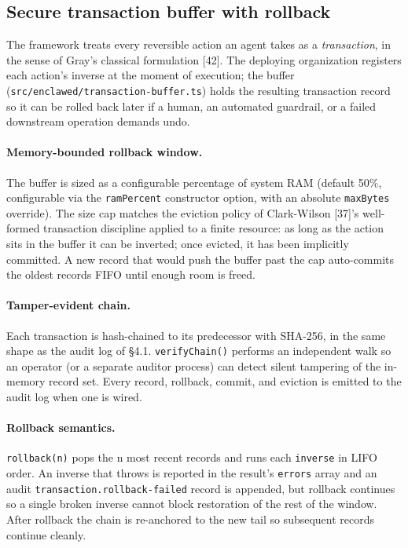 \documentclass[11pt]{article}
\begin{document}
\subsection{Secure transaction buffer with rollback}
\label{sec:tx}

The framework treats every reversible action an agent takes as a
\emph{transaction}, in the sense of Gray's classical formulation
[42]. The deploying organization registers each action's inverse at
the moment of execution; the buffer (\texttt{src/enclawed/transaction-buffer.ts})
holds the resulting transaction record so it can be rolled back later
if a human, an automated guardrail, or a failed downstream operation
demands undo.

\paragraph{Memory-bounded rollback window.} The buffer is sized as a
configurable percentage of system RAM (default 50\%, configurable via
the \texttt{ramPercent} constructor option, with an absolute
\texttt{maxBytes} override). The size cap matches the eviction policy
of Clark-Wilson [37]'s well-formed transaction discipline applied to a
finite resource: as long as the action sits in the buffer it can be
inverted; once evicted, it has been implicitly committed. A new record
that would push the buffer past the cap auto-commits the oldest
records FIFO until enough room is freed.

\paragraph{Tamper-evident chain.} Each transaction is hash-chained to
its predecessor with SHA-256, in the same shape as the audit log of
§4.1. \texttt{verifyChain()} performs an independent walk so an
operator (or a separate auditor process) can detect silent tampering
of the in-memory record set. Every record, rollback, commit, and
eviction is emitted to the audit log when one is wired.

\paragraph{Rollback semantics.} \texttt{rollback(n)} pops the n most
recent records and runs each \texttt{inverse} in LIFO order. An
inverse that throws is reported in the result's \texttt{errors} array
and an audit \texttt{transaction.rollback-failed} record is appended,
but rollback continues so a single broken inverse cannot block
restoration of the rest of the window. After rollback the chain is
re-anchored to the new tail so subsequent records continue cleanly.
\end{document}
